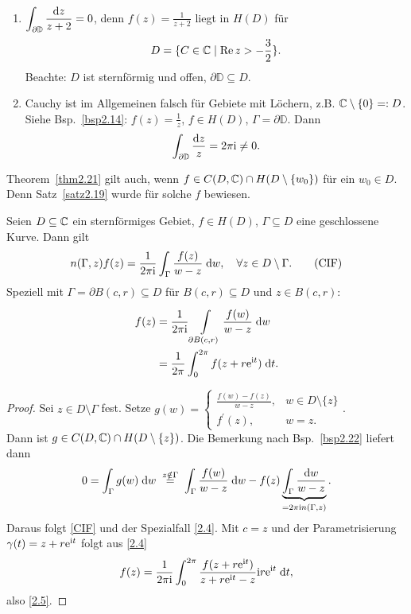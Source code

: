 \documentclass[a4paper,twoside,DIV15,BCOR12mm]{scrbook}
\begin{document}
\begin{bsp} \label{bsp2.22}
  \begin{enumerate}
  \item $\displaystyle\int_{\partial\mathbb{D}}{\frac{\mathrm{d} z}{z+2}}=0$, denn $f(z)=\frac{1}{z+2}$ liegt in $H(D)$ für
    \[D=\{C\in\mathbb{C} \mid \operatorname{Re}{z} > -\frac32\}.\] Beachte: $D$ ist sternförmig und offen, $\partial\mathbb{D}\subseteq D$.
  \item Cauchy ist im Allgemeinen falsch für Gebiete mit Löchern, z.B. $\mathbb{C}\setminus\{0\}=: D$. Siehe Bsp.~\ref{bsp2.14}:
    $f(z)=\frac1z$, $f\in H(D)$, $\Gamma=\partial\mathbb{D}$. Dann \[\int_{\partial\mathbb{D}}{\frac{\mathrm{d} z}{z}} = 2\pi\mathrm{i}
    \neq 0.\]
  \end{enumerate}
\end{bsp}

\begin{bem*}
  Theorem~\ref{thm2.21} gilt auch, wenn $f\in C(D,\mathbb{C}) \cap H(D\setminus\{w_0\})$ für ein $w_0\in D$. Denn Satz~\ref{satz2.19} wurde
  für solche $f$ bewiesen.
\end{bem*}

\begin{thm}\label{thm2.23}
  Seien $D\subseteq\mathbb{C}$ ein sternförmiges Gebiet, $f\in H(D)$, $\Gamma\subseteq D$ eine geschlossene Kurve. Dann gilt
  \begin{equation} \label{CIF}
    n(\Gamma,z) f(z) = \frac{1}{2\pi\mathrm{i}} \int_{\Gamma}^{}{\frac{f(z)}{w-z}}\;\mathrm{d} w, \quad \forall z\in D\setminus\Gamma.
    \tag{CIF}
  \end{equation}
  Speziell mit $\Gamma=\partial B(c,r)\subseteq D$ für $B(c,r)\subseteq D$ und $z\in B(c,r)$:
  \begin{align}
    \label{2.4}
    f(z) &= \frac{1}{2\pi\mathrm{i}} \int\limits_{\partial B(c,r)}^{}{\frac{f(w)}{w-z}}\;\mathrm{d}w \\
    \label{2.5}
    &= \frac{1}{2\pi} \int_{0}^{2\pi}{f(z+r\mathrm{e}^{\mathrm{i} t})}\;\mathrm{d} t.
  \end{align}
\end{thm}
\begin{proof}
  Sei $z\in D\setminus\Gamma$ fest. Setze $\displaystyle g(w) = \begin{cases}
    \frac{f(w)-f(z)}{w-z}, &w\in D\setminus\{z\} \\
    f^\prime(z),            &w=z.
  \end{cases}$.\\
  Dann ist $g\in C(D,\mathbb{C})\cap H(D\setminus\{z\})$. Die Bemerkung nach Bsp.~\ref{bsp2.22} liefert dann
  \[ 0 = \integral{\Gamma}{}{g(w)}{w} \wegen{=}{z\notin\Gamma} \integral{\Gamma}{}{\frac{f(w)}{w-z}}{w} - f(z)
  \underbrace{\int_\Gamma{\frac{\d w}{w-z}}}_{=2\pi\i n(\Gamma,z)}. \]
  Daraus folgt \eqref{CIF} und der Spezialfall \eqref{2.4}. Mit $c=z$ und der Parametrisierung $\gamma(t)=z+r\mathrm{e}^{\mathrm{i} t}$ folgt
  aus \eqref{2.4}
  \[ f(z) = \frac{1}{2\pi\mathrm{i}} \int_{0}^{2\pi}{\frac{f(z+r \mathrm{e}^{\mathrm{i} t})}{z+r \mathrm{e}^{\mathrm{i} t} - z}\mathrm{i} r\mathrm{e}^{\mathrm{i} t}}\;\mathrm{d} t, \]
  also \eqref{2.5}.
\end{proof}
\end{document}
